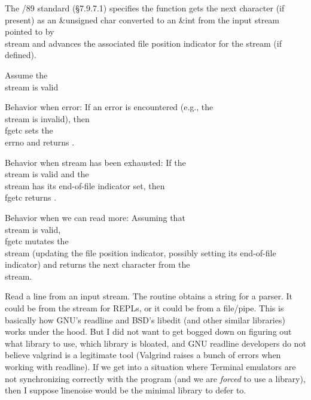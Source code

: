 The \CEE/89 standard (\S7.9.7.1) specifies the
 function gets the next
character (if
present) as an \&{unsigned char} converted to an \&{int} from the
input stream pointed to by \\{stream} and advances the associated file
position indicator for the stream (if defined).

Assume the \\{stream} is valid

\bull Behavior when error:
If an error is encountered (e.g., the \\{stream} is invalid),
then \\{fgetc} sets the \\{errno} and returns .

\bull Behavior when stream has been exhausted:
If the \\{stream} is valid and the \\{stream} has its end-of-file indicator
set,
then \\{fgetc} returns .

\bull Behavior when we can read more:
Assuming that \\{stream} is valid, \\{fgetc} mutates the \\{stream}
(updating the file position indicator, possibly setting its
end-of-file indicator) and returns the next character from the \\{stream}.


\fi

Read a line from an input stream.
The  routine obtains a string for a parser.
It could be from the  stream for REPLs, or it could be from a
file/pipe.
This is basically how GNU's readline and BSD's libedit (and other
similar libraries) works under the hood. But I did not want to get
bogged down on figuring out what library to use, which library is
bloated, and GNU readline developers do not believe valgrind is a
legitimate tool (Valgrind raises a bunch of errors when working with
readline). If we get into a situation where Terminal emulators are not
synchronizing correctly with the program (and we are {\it forced} to
use a library), then I suppose \.{linenoise} would be the minimal library
to defer to.

